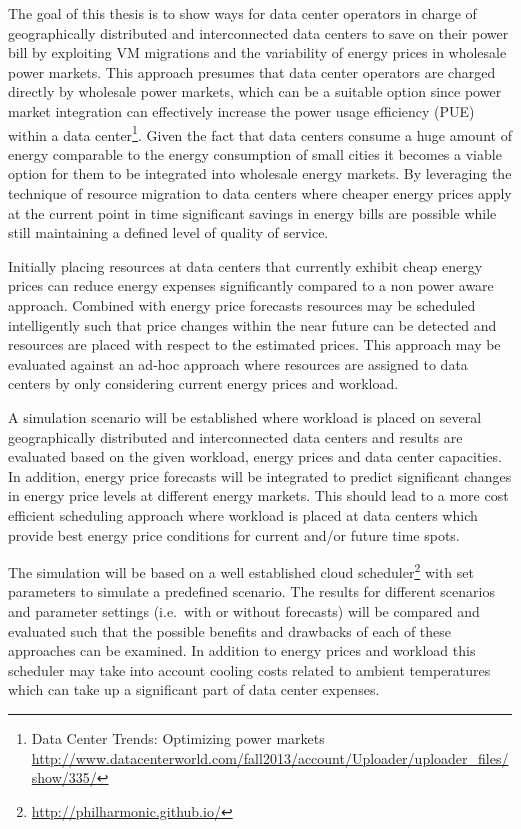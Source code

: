 The goal of this thesis is to show ways for data center operators in charge of geographically distributed and interconnected data centers to save on their power bill by exploiting VM migrations and the variability of energy prices in wholesale power markets. This approach presumes that data center operators are charged directly by wholesale power markets, which can be a suitable option since power market integration can effectively increase the power usage efficiency (PUE) within a data center\footnote{Data Center Trends: Optimizing power markets \url{http://www.datacenterworld.com/fall2013/account/Uploader/uploader\_files/show/335/}}. Given the fact that data centers consume a huge amount of energy comparable to the energy consumption of small cities\cite{qureshi2009cutting} it becomes a viable option for them to be integrated into wholesale energy markets. By leveraging the technique of resource migration to data centers where cheaper energy prices apply at the current point in time significant savings in energy bills are possible while still maintaining a defined level of quality of service. 

Initially placing resources at data centers that currently exhibit cheap energy prices can reduce energy expenses significantly compared to a non power aware approach. Combined with energy price forecasts resources may be scheduled intelligently such that price changes within the near future can be detected and resources are placed with respect to the estimated prices. This approach may be evaluated against an ad-hoc approach where resources are assigned to data centers by only considering current energy prices and workload. 

A simulation scenario will be established where workload is placed on several geographically distributed and interconnected data centers and results are evaluated based on the given workload, energy prices and data center capacities. In addition, energy price forecasts will be integrated to predict significant changes in energy price levels at different energy markets. This should lead to a more cost efficient scheduling approach where workload is placed at data centers which provide best energy price conditions for current and/or future time spots. 

The simulation will be based on a well established cloud scheduler\footnote{\url{http://philharmonic.github.io/}} with set parameters to simulate a predefined scenario. The results for different scenarios and parameter settings (i.e.~with or without forecasts) will be compared and evaluated such that the possible benefits and drawbacks of each of these approaches can be examined. 
In addition to energy prices and workload this scheduler may take into account cooling costs related to ambient temperatures which can take up a significant part of data center expenses. 

